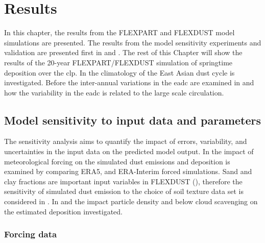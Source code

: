 \chapter{Results}\label{Chap:Results}
In this chapter, the results from the FLEXPART and FLEXDUST model simulations are presented. 
The results from the model sensitivity experiments and validation are presented first in  and . 
The rest of this Chapter will show the results of the 20-year FLEXPART/FLEXDUST simulation of springtime deposition over the \acrshort{clp}. 
In  the climatology of the East Asian dust cycle is investigated.   
Before the inter-annual variations in the \acrshort{eadc} are examined in  and how the variability in the \acrshort{eadc} is related to the large scale circulation. 


\section{Model sensitivity to input data and parameters}\label{sec:sensitvity_experiment}
The sensitivity analysis aims to quantify the impact of errors, variability, and uncertainties in the input data on the predicted model output. 
In  the impact of meteorological forcing on the simulated dust emissions and deposition is examined by comparing ERA5, and ERA-Interim forced simulations. 
Sand and clay fractions are important input variables in FLEXDUST (), therefore the sensitivity of simulated dust emission to the choice of soil texture data set is considered in . 
In  and  the impact particle density and below cloud scavenging on the estimated deposition investigated. 
\subsection{Forcing data}\label{sec:sens_forcing}

